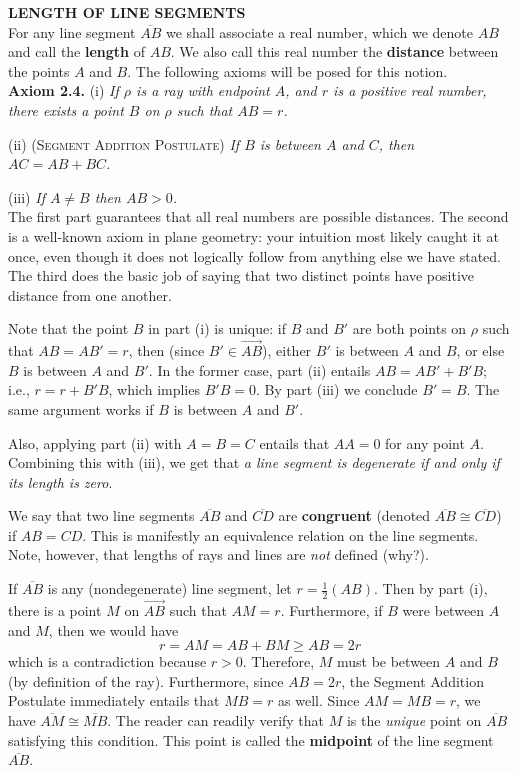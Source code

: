 \documentclass[leqno]{book}
\begin{document}
\noindent\textbf{LENGTH OF LINE SEGMENTS}\\

\noindent For any line segment $\overline{AB}$ we shall associate a real number, which we denote $AB$ and call the \textbf{length} of $AB$.  We also call this real number the \textbf{distance} between the points $A$ and $B$.  The following axioms will be posed for this notion.\\

\noindent\textbf{Axiom 2.4.} (i) \emph{If $\rho$ is a ray with endpoint $A$, and $r$ is a positive real number, there exists a point $B$ on $\rho$ such that $AB=r$.}

(ii) \textsc{(Segment Addition Postulate)} \emph{If $B$ is between $A$ and $C$, then $AC=AB+BC$.}

(iii) \emph{If $A\ne B$ then $AB>0$.}\\

The first part guarantees that all real numbers are possible distances.  The second is a well-known axiom in plane geometry: your intuition most likely caught it at once, even though it does not logically follow from anything else we have stated.  The third does the basic job of saying that two distinct points have positive distance from one another.

Note that the point $B$ in part (i) is unique: if $B$ and $B'$ are both points on $\rho$ such that $AB=AB'=r$, then (since $B'\in\overset{\longrightarrow}{AB}$), either $B'$ is between $A$ and $B$, or else $B$ is between $A$ and $B'$.  In the former case, part (ii) entails $AB=AB'+B'B$; i.e., $r=r+B'B$, which implies $B'B=0$.  By part (iii) we conclude $B'=B$.  The same argument works if $B$ is between $A$ and $B'$.

Also, applying part (ii) with $A=B=C$ entails that $AA=0$ for any point $A$.  Combining this with (iii), we get that \emph{a line segment is degenerate if and only if its length is zero}.

We say that two line segments $\overline{AB}$ and $\overline{CD}$ are \textbf{congruent} (denoted $\overline{AB}\cong\overline{CD}$) if $AB=CD$.  This is manifestly an equivalence relation on the line segments.  Note, however, that lengths of rays and lines are \emph{not} defined (why?).

If $\overline{AB}$ is any (nondegenerate) line segment, let $r=\frac 12(AB)$.  Then by part (i), there is a point $M$ on $\overset{\longrightarrow}{AB}$ such that $AM=r$.  Furthermore, if $B$ were between $A$ and $M$, then we would have
$$r=AM=AB+BM\geqslant AB=2r$$
which is a contradiction because $r>0$.  Therefore, $M$ must be between $A$ and $B$ (by definition of the ray).  Furthermore, since $AB=2r$, the Segment Addition Postulate immediately entails that $MB=r$ as well.  Since $AM=MB=r$, we have $\overline{AM}\cong\overline{MB}$.  The reader can readily verify that $M$ is the \emph{unique} point on $\overline{AB}$ satisfying this condition.  This point is called the \textbf{midpoint} of the line segment $\overline{AB}$.\\
\end{document}
